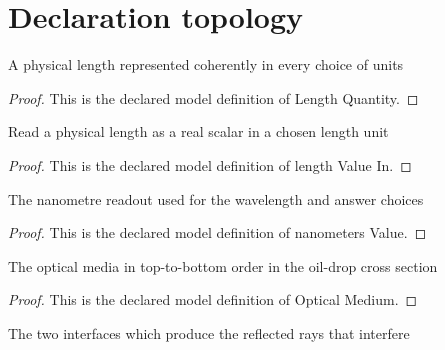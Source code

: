 \section{Declaration topology}
\begin{definition}
  \label{def:physics:phyx-mini-0084:phyxminiproblems-problemphyxmini0084-lengthquantity}
  A physical length represented coherently in every choice of units
\end{definition}
\begin{proof}
  This is the declared model definition of Length Quantity.
\end{proof}
\begin{definition}
  \label{def:physics:phyx-mini-0084:phyxminiproblems-problemphyxmini0084-lengthvaluein}
  Read a physical length as a real scalar in a chosen length unit
\end{definition}
\begin{proof}
  This is the declared model definition of length Value In.
\end{proof}
\begin{definition}
  \label{def:physics:phyx-mini-0084:phyxminiproblems-problemphyxmini0084-nanometersvalue}
  The nanometre readout used for the wavelength and answer choices
\end{definition}
\begin{proof}
  This is the declared model definition of nanometers Value.
\end{proof}
\begin{definition}
  \label{def:physics:phyx-mini-0084:phyxminiproblems-problemphyxmini0084-opticalmedium}
  The optical media in top-to-bottom order in the oil-drop cross section
\end{definition}
\begin{proof}
  This is the declared model definition of Optical Medium.
\end{proof}
\begin{definition}
  \label{def:physics:phyx-mini-0084:phyxminiproblems-problemphyxmini0084-filminterface}
  The two interfaces which produce the reflected rays that interfere
\end{definition}
